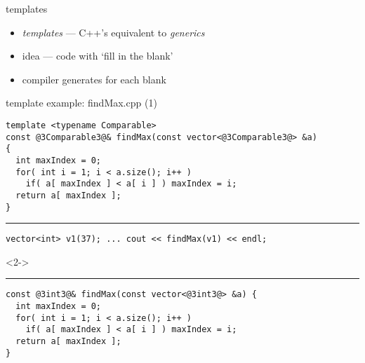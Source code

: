 \begin{frame}[fragile,label=templateIntro]{templates}
\lstset{
    language=C++,
    style=small,
}
    \begin{itemize}
    \item \textit{templates} --- C++'s equivalent to \textit{generics}
    \vspace{.5cm}
    \item idea --- code with `fill in the blank'
    \item compiler generates  for each blank
    \end{itemize}
\end{frame}

\begin{frame}[fragile,label=findMax]{template example: findMax.cpp (1)}
\begin{lstlisting}
template <typename Comparable>
const @3Comparable3@& findMax(const vector<@3Comparable3@> &a)
{
  int maxIndex = 0; 
  for( int i = 1; i < a.size(); i++ ) 
    if( a[ maxIndex ] < a[ i ] ) maxIndex = i; 
  return a[ maxIndex ]; 
}
\end{lstlisting}
\hrule
\begin{lstlisting}
vector<int> v1(37); ... cout << findMax(v1) << endl;
\end{lstlisting}
\begin{visibleenv}<2->
\hrule
\begin{lstlisting}
const @3int3@& findMax(const vector<@3int3@> &a) {
  int maxIndex = 0; 
  for( int i = 1; i < a.size(); i++ ) 
    if( a[ maxIndex ] < a[ i ] ) maxIndex = i; 
  return a[ maxIndex ]; 
}
\end{lstlisting}
\end{visibleenv}
\end{frame}

